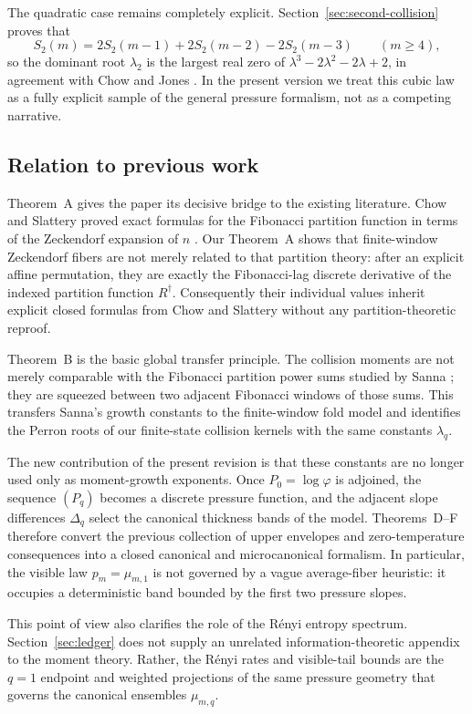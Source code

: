 \medskip
\noindent
The quadratic case remains completely explicit.  Section~\ref{sec:second-collision}
proves that
\[
  S_2(m)=2S_2(m-1)+2S_2(m-2)-2S_2(m-3)
  \qquad (m\ge 4),
\]
so the dominant root \(\lambda_2\) is the largest real zero of
\(\lambda^3-2\lambda^2-2\lambda+2\), in agreement with Chow and Jones
\cite{ChowJones2024}.  In the present version we treat this cubic law as a
fully explicit sample of the general pressure formalism, not as a competing
narrative.

\subsection{Relation to previous work}

Theorem~A gives the paper its decisive bridge to the existing literature.
Chow and Slattery proved exact formulas for the Fibonacci partition function in
terms of the Zeckendorf expansion of \(n\) \cite{ChowSlattery2021}.  Our
Theorem~A shows that finite-window Zeckendorf fibers are not merely related to
that partition theory: after an explicit affine permutation, they are exactly
the Fibonacci-lag discrete derivative of the indexed partition function
\(R^\dagger\).  Consequently their individual values inherit explicit closed
formulas from Chow and Slattery without any partition-theoretic reproof.

Theorem~B is the basic global transfer principle.  The collision moments are
not merely comparable with the Fibonacci partition power sums studied by Sanna
\cite{Sanna2025}; they are squeezed between two adjacent Fibonacci windows of
those sums.  This transfers Sanna's growth constants to the finite-window fold
model and identifies the Perron roots of our finite-state collision kernels
with the same constants \(\lambda_q\).

The new contribution of the present revision is that these constants are no
longer used only as moment-growth exponents.  Once \(P_0=\log\varphi\) is
adjoined, the sequence \((P_q)\) becomes a discrete pressure function, and the
adjacent slope differences \(\Delta_q\) select the canonical thickness bands of
the model.  Theorems~D--F therefore convert the previous collection of upper
envelopes and zero-temperature consequences into a closed canonical and
microcanonical formalism.  In particular, the visible law \(p_m=\mu_{m,1}\) is
not governed by a vague average-fiber heuristic: it occupies a deterministic
band bounded by the first two pressure slopes.

This point of view also clarifies the role of the R\'enyi entropy spectrum.
Section~\ref{sec:ledger} does not supply an unrelated information-theoretic
appendix to the moment theory.  Rather, the R\'enyi rates and visible-tail
bounds are the \(q=1\) endpoint and weighted projections of the same pressure
geometry that governs the canonical ensembles \(\mu_{m,q}\).

